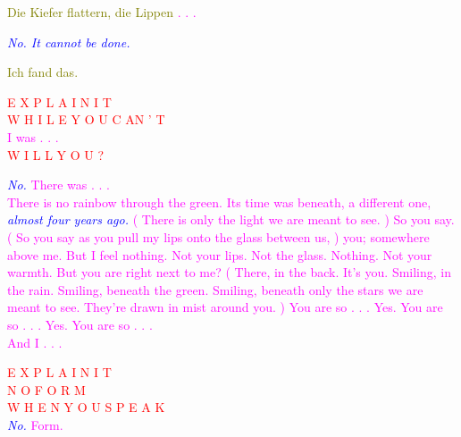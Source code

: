 \documentclass[11pt]{article}
\begin{document}
\begingroup
\begin{center}
\textcolor{olive}{Die Kiefer flattern, die Lippen} \textcolor{magenta}{. . .}
\end{center}
\endgroup

\begingroup
\begin{center}
\textit{\textcolor{blue}{No. It cannot be done.}}
\end{center}
\endgroup

\begingroup
\begin{center}
\textcolor{olive}{Ich fand das.}
\end{center}
\endgroup

\begingroup
\begin{center}
\textcolor{red}{E X P L A I N \hspace{10mm} I T \\ W H I L E \hspace{10mm} Y O U \hspace{10mm}  C AN ' T \\} \textcolor{magenta}{I was . . . \\ } \textcolor{red}{W I L L \hspace{10mm} Y O U ? \\ } 
\end{center}
\endgroup

\begingroup
\begin{center}
\textit{\textcolor{blue}{No.}} \textcolor{magenta}{There was . . . \\ There is no rainbow through the green. Its time was beneath, a different one,} \textit{\textcolor{blue}{almost four years ago.}} \textcolor{magenta}{( There is only the light we are meant to see. ) So you say. ( So you say as you pull my lips onto the glass between us, ) you; somewhere above me. But I feel nothing. Not your lips. Not the glass. Nothing. Not your warmth. But you are right next to me? ( There, in the back. It's you. Smiling, in the rain. Smiling, beneath the green. Smiling, beneath only the stars we are meant to see. They're drawn in mist around you. ) You are so . . . Yes. You are so . . . Yes. You are so . . . \\ And I . . .} 
\end{center}
\endgroup

\begingroup
\begin{center}
\textcolor{red}{E X P L A I N \hspace{10mm} I T \\ N O \hspace{10mm}  F O R M \\ W H E N \hspace{10mm} Y O U \hspace{10mm} S P E A K \\} \textit{\textcolor{blue}{No.}} \textcolor{magenta}{Form.}
\end{center}
\endgroup
\end{document}
